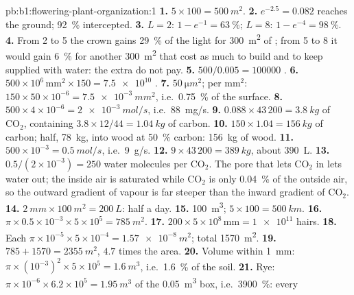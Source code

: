\begin{solution}{pb:b1:flowering-plant-organization:1}
\textbf{1.} $5\times 100 = \qty{500}{m^2}$.
\textbf{2.} $e^{-2.5} = 0.082$ reaches the ground; \qty{92}{\%}
intercepted.
\textbf{3.} $L = 2$: $1 - e^{-1} = \qty{63}{\%}$; $L = 8$: $1 -
e^{-4} = \qty{98}{\%}$.
\textbf{4.} From 2 to 5 the crown gains \qty{29}{\%} of the light for
\qty{300}{m^2} of ; from 5 to 8 it would gain \qty{6}{\%} for
another \qty{300}{m^2} that cost as much to build and to keep supplied
with water: the extra  do not pay.
\textbf{5.} $500/0.005 = \num{100000}$ .
\textbf{6.} $500\times 10^6\,\mathrm{mm^2}\times 150 = \num{7.5e10}$
.
\textbf{7.} $\qty{50}{\micro m^2}$; per mm$^2$: $150\times 50\times
10^{-6} = \qty{7.5e-3}{mm^2}$, i.e.\ \qty{0.75}{\%} of the surface.
\textbf{8.} $500\times 4\times 10^{-6} = \qty{2e-3}{mol/s}$, i.e.\
\qty{88}{mg/s}.
\textbf{9.} $0.088\times 43\,200 = \qty{3.8}{kg}$ of $\mathrm{CO_2}$,
containing $3.8\times 12/44 = \qty{1.04}{kg}$ of carbon.
\textbf{10.} $150\times 1.04 = \qty{156}{kg}$ of carbon; half,
\qty{78}{kg}, into wood at \qty{50}{\%} carbon: \qty{156}{kg} of wood.
\textbf{11.} $500\times 10^{-3} = \qty{0.5}{mol/s}$, i.e.\ \qty{9}{g/s}.
\textbf{12.} $9\times 43\,200 = \qty{389}{kg}$, about \qty{390}{L}.
\textbf{13.} $0.5/(2\times 10^{-3}) = 250$ water molecules per
$\mathrm{CO_2}$. The pore that lets $\mathrm{CO_2}$ in lets water out;
the inside air is saturated while $\mathrm{CO_2}$ is only
\qty{0.04}{\%} of the outside air, so the outward gradient of vapour is
far steeper than the inward gradient of $\mathrm{CO_2}$.
\textbf{14.} $\qty{2}{mm}\times\qty{100}{m^2} = \qty{200}{L}$: half a
day.
\textbf{15.} \qty{100}{m^3}; $5\times 100 = \qty{500}{km}$.
\textbf{16.} $\pi\times 0.5\times 10^{-3}\times 5\times 10^5 =
\qty{785}{m^2}$.
\textbf{17.} $200\times 5\times 10^8\,\mathrm{mm} = \num{1e11}$ hairs.
\textbf{18.} Each $\pi\times 10^{-5}\times 5\times 10^{-4} =
\qty{1.57e-8}{m^2}$; total \qty{1570}{m^2}.
\textbf{19.} $785 + 1570 = \qty{2355}{m^2}$, $4.7$ times the  area.
\textbf{20.} Volume within \qty{1}{mm}: $\pi\times(10^{-3})^2\times 5
\times 10^5 = \qty{1.6}{m^3}$, i.e.\ \qty{1.6}{\%} of the soil.
\textbf{21.} Rye: $\pi\times 10^{-6}\times 6.2\times 10^5 =
\qty{1.95}{m^3}$ of the \qty{0.05}{m^3} box, i.e.\ \qty{3900}{\%}: every

\end{solution}
